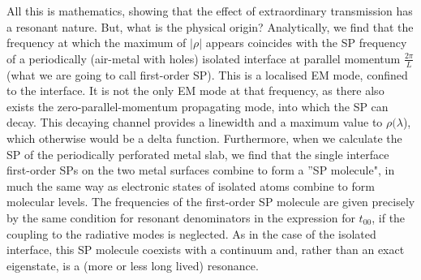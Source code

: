 All this is mathematics, showing that the effect of extraordinary
transmission has a resonant nature. But, what is the physical origin?
Analytically, we find that the frequency at which the maximum of $|\rho|$
appears coincides with the SP frequency of a
periodically  (air-metal with holes) isolated interface at parallel
momentum $\frac{2 \pi}{L}$ (what we are going to call first-order SP). This
is a localised EM mode, confined to the interface. It is not the only EM
mode at that frequency, as there also exists the zero-parallel-momentum
propagating mode, into which the SP can decay. This decaying channel
provides a linewidth and a maximum value to $\rho(\lambda$), which otherwise
would be a delta function. Furthermore, when we calculate the SP of the
periodically perforated metal slab, we find that
the single interface first-order SPs on the two metal surfaces
combine to form a ''SP molecule", in
much the same way as electronic states of isolated atoms combine to form
molecular levels. The frequencies of the first-order SP molecule are
given precisely by the same condition for resonant denominators
in the expression for $t_{00}$, if the coupling to the 
radiative modes is neglected.
As in the case of the isolated interface, this SP molecule coexists
with a continuum and, rather than an exact eigenstate, is a (more or
less long lived) resonance.


